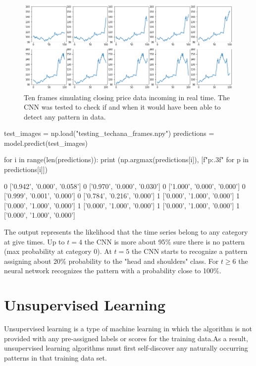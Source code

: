 \begin{figure}
\centering
\includegraphics[width=\textwidth]{figures/tech_ana_frames}
\caption{Ten frames simulating closing price data incoming in real time. The CNN was tested to check if and when it would have been able to detect any pattern in data.}
\label{fig:frame_simulation}
\end{figure}

\begin{ipythonnon}
test_images = np.load("testing_techana_frames.npy")
predictions = model.predict(test_images)

for i in range(len(predictions)):
    print (np.argmax(predictions[i]), [f"{p:.3f}" for p in predictions[i]])
\end{ipythonnon}
\begin{ioutput}
0 ['0.942', '0.000', '0.058']
0 ['0.970', '0.000', '0.030']
0 ['1.000', '0.000', '0.000']
0 ['0.999', '0.001', '0.000']
0 ['0.784', '0.216', '0.000']
1 ['0.000', '1.000', '0.000']
1 ['0.000', '1.000', '0.000']
1 ['0.000', '1.000', '0.000']
1 ['0.000', '1.000', '0.000']
1 ['0.000', '1.000', '0.000']
\end{ioutput}
\noindent
The output represents the likelihood that the time series  belong to any category at give times. Up to $t=4$ the CNN is more about 95\% sure there is no pattern (max probability at category 0). 
At $t=5$ the CNN starts to recognize a pattern assigning about 20\% probability to the "head and shoulders" class. For $t\geq 6$ the neural network recognizes the pattern with a probability close to 100\%.

\section{Unsupervised Learning}
    
Unsupervised learning is a type of machine learning in which the algorithm is not provided with any pre-assigned labels or scores for the training data.As a result, unsupervised learning algorithms must first self-discover any naturally occurring patterns in that training data set. 
    
